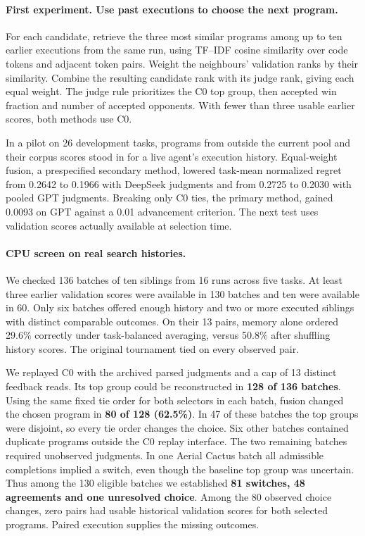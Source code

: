\documentclass{article}
\begin{document}
\paragraph{First experiment. Use past executions to choose the next program.}
For each candidate, retrieve the three most similar programs among up to ten earlier executions from the same run, using TF--IDF cosine similarity over code tokens and adjacent token pairs. Weight the neighbours' validation ranks by their similarity. Combine the resulting candidate rank with its judge rank, giving each equal weight. The judge rule prioritizes the C0 top group, then accepted win fraction and number of accepted opponents. With fewer than three usable earlier scores, both methods use C0.

In a pilot on 26 development tasks, programs from outside the current pool and their corpus scores stood in for a live agent's execution history. Equal-weight fusion, a prespecified secondary method, lowered task-mean normalized regret from 0.2642 to 0.1966 with DeepSeek judgments and from 0.2725 to 0.2030 with pooled GPT judgments. Breaking only C0 ties, the primary method, gained 0.0093 on GPT against a 0.01 advancement criterion. The next test uses validation scores actually available at selection time.

\paragraph{CPU screen on real search histories.}
We checked 136 batches of ten siblings from 16 runs across five tasks. At least three earlier validation scores were available in 130 batches and ten were available in 60. Only six batches offered enough history and two or more executed siblings with distinct comparable outcomes. On their 13 pairs, memory alone ordered 29.6\% correctly under task-balanced averaging, versus 50.8\% after shuffling history scores. The original tournament tied on every observed pair.

We replayed C0 with the archived parsed judgments and a cap of 13 distinct feedback reads. Its top group could be reconstructed in \textbf{128 of 136 batches}. Using the same fixed tie order for both selectors in each batch, fusion changed the chosen program in \textbf{80 of 128 (62.5\%)}. In 47 of these batches the top groups were disjoint, so every tie order changes the choice. Six other batches contained duplicate programs outside the C0 replay interface. The two remaining batches required unobserved judgments. In one Aerial Cactus batch all admissible completions implied a switch, even though the baseline top group was uncertain. Thus among the 130 eligible batches we established \textbf{81 switches, 48 agreements and one unresolved choice}. Among the 80 observed choice changes, zero pairs had usable historical validation scores for both selected programs. Paired execution supplies the missing outcomes.
\end{document}
